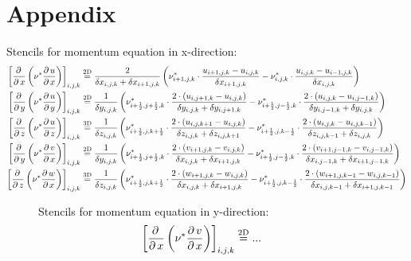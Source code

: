 \documentclass[11pt,a4paper]{article}
\begin{document}
\section*{Appendix}\label{sec:appendix}
\begin{landscape}
Stencils for momentum equation in x-direction:
\begin{align*}
\left[ \abl{}{x}\left( \nu^*\abl{u}{x} \right) \right]_{i,j,k}&\eqvd
\frac{2}{\delta x_{i,j,k}+\delta x_{i+1,j,k}}
\left(
\nu^*_{i+1,j,k}\cdot\frac{u_{i+1,j,k}-u_{i,j,k}}{\delta x_{i+1,j,k}}
-
\nu^*_{i,j,k}\cdot\frac{u_{i,j,k}-u_{i-1,j,k}}{\delta x_{i,j,k}}
\right)
%
%
%
%
\\
\left[ \abl{}{y}\left( \nu^*\abl{u}{y} \right) \right]_{i,j,k}&\eqvd
\frac{1}{\delta y_{i,j,k}}
\left(
\nu^*_{i+\frac{1}{2},j+\frac{1}{2},k}\cdot\frac{2 \cdot (u_{i,j+1,k}-u_{i,j,k})}{\delta y_{i,j,k}+\delta y_{i,j+1,k}}
-
\nu^*_{i+\frac{1}{2},j-\frac{1}{2},k}\cdot\frac{2\cdot(u_{i,j,k}-u_{i,j-1,k})}{\delta y_{i,j-1,k}+\delta y_{i,j,k}}
\right)
%
%
%
%
\\
\left[ \abl{}{z}\left( \nu^*\abl{u}{z} \right) \right]_{i,j,k}&\eqvdd
\frac{1}{\delta z_{i,j,k}}
\left(
\nu^*_{i+\frac{1}{2},j,k+\frac{1}{2}}\cdot\frac{2 \cdot (u_{i,j,k+1}-u_{i,j,k})}{\delta z_{i,j,k}+\delta z_{i,j,k+1}}
-
\nu^*_{i+\frac{1}{2},j,k-\frac{1}{2}}\cdot\frac{2\cdot(u_{i,j,k}-u_{i,j,k-1})}{\delta z_{i,j,k-1}+\delta z_{i,j,k}}
\right)
%
%
%
%
\\
\left[ \abl{}{y}\left( \nu^*\abl{v}{x} \right) \right]_{i,j,k}&\eqvd
\frac{1}{\delta y_{i,j,k}}
\left(
\nu^*_{i+\frac{1}{2},j+\frac{1}{2},k}\cdot\frac{2 \cdot ( v_{i+1,j,k}- v_{i,j,k})}{\delta x_{i,j,k}+\delta x_{i+1,j,k}}
-
\nu^*_{i+\frac{1}{2},j-\frac{1}{2},k}\cdot\frac{2 \cdot ( v_{i+1,j-1,k} - v_{i,j-1,k})}{\delta x_{i,j-1,k}+\delta x_{i+1,j-1,k}}
\right)
%
%
%
%
\\
\left[ \abl{}{z}\left( \nu^*\abl{w}{x} \right) \right]_{i,j,k}&\eqvdd
\frac{1}{\delta z_{i,j,k}}
\left(
\nu^*_{i+\frac{1}{2},j,k+\frac{1}{2}}\cdot\frac{2 \cdot ( w_{i+1,j,k}- w_{i,j,k})}{\delta x_{i,j,k}+\delta x_{i+1,j,k}}
-
\nu^*_{i+\frac{1}{2},j,k-\frac{1}{2}}\cdot\frac{2 \cdot ( w_{i+1,j,k-1} - w_{i,j,k-1})}{\delta x_{i,j,k-1}+\delta x_{i+1,j,k-1}}
\right)
\\
\end{align*}
\begin{figure}[htbp]
\begin{minipage}{0.49\textheight}
Stencils for momentum equation in y-direction:
\begin{align*}
\left[ \abl{}{x}\left( \nu^*\abl{v}{x} \right) \right]_{i,j,k}&\eqvd ...

\end{align*}
\end{minipage}
\end{figure}
\end{landscape}
\end{document}
